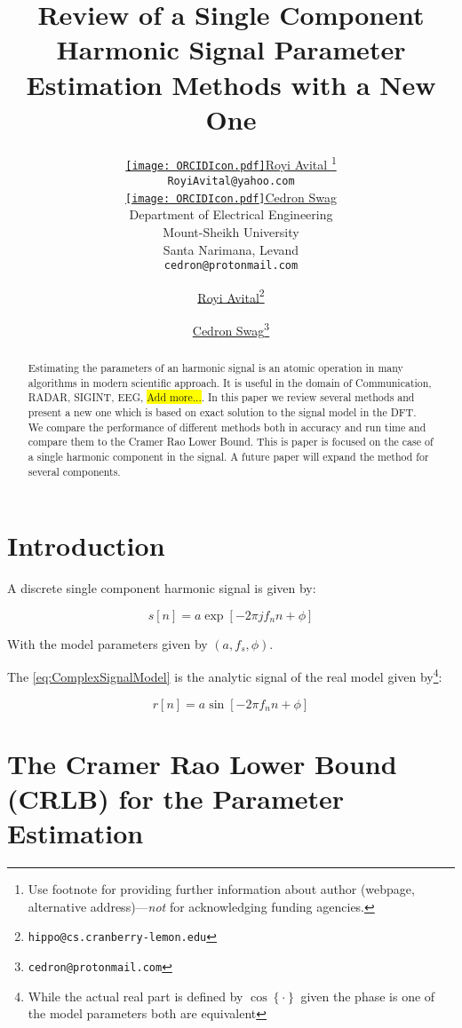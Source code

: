 \documentclass{article}
\title{Review of a Single Component Harmonic Signal Parameter Estimation Methods with a New One}
\author{ \href{https://orcid.org/0000-0001-9316-0369}{\texttt{[image: ORCIDIcon.pdf]}\hspace{1mm}Royi Avital }\thanks{Use footnote for providing further
		information about author (webpage, alternative
		address)---\emph{not} for acknowledging funding agencies.} \\
	\texttt{RoyiAvital@yahoo.com} \\
	\And
	\href{https://orcid.org/0000-0000-0000-0000}{\texttt{[image: ORCIDIcon.pdf]}\hspace{1mm}Cedron Swag} \\
	Department of Electrical Engineering\\
	Mount-Sheikh University\\
	Santa Narimana, Levand \\
	\texttt{cedron@protonmail.com} \\
}
\author[1]{%
	\href{https://orcid.org/0000-0001-9316-0369}{\usebox{\orcid}\hspace{1mm}Royi Avital\thanks{\texttt{hippo@cs.cranberry-lemon.edu}}}%
}
\author[1,2]{%
	\href{https://orcid.org/0000-0000-0000-0000}{\usebox{\orcid}\hspace{1mm}Cedron Swag\thanks{\texttt{cedron@protonmail.com}}}%
}
\affil[1]{}
\affil[2]{}
\newcommand{\MyParen}[1]{\left( #1 \right)}
\newcommand{\MyBrack}[1]{\left\lbrack #1 \right\rbrack}
\newcommand{\MyBrace}[1]{\left\lbrace #1 \right\rbrace}
\newcommand{\marker}[1]{\colorbox{yellow}{#1}}
\begin{document}
\maketitle

\begin{abstract}
	Estimating the parameters of an harmonic signal is an atomic operation in many algorithms in modern scientific approach. It is useful in the domain of Communication, RADAR, SIGINT, EEG, \marker{Add more...}. In this paper we review several methods and present a new one which is based on exact solution to the signal model in the DFT. We compare the performance of different methods both in accuracy and run time and compare them to the Cramer Rao Lower Bound. This is paper is focused on the case of a single harmonic component in the signal. A future paper will expand the method for several components.
\end{abstract}




\section{Introduction}
\label{sec:Intro}

A discrete single component harmonic signal is given by:

\begin{equation}
	 s \MyBrack{n} = a \exp \MyBrack{-2 \pi j {f}_{n} n + \phi} \tag{Complex Harmonic Signal} \label{eq:ComplexSignalModel}
\end{equation}

With the model parameters given by $ \MyParen{a, {f}_{s}, \phi} $.

The \ref{eq:ComplexSignalModel} is the analytic signal of the real model given by\footnote{While the actual real part is defined by $ \cos \MyBrace{\cdot} $ given the phase is one of the model parameters both are equivalent}:

\begin{equation}
	r \MyBrack{n} = a \sin \MyBrack{-2 \pi {f}_{n} n + \phi} \tag{Real Harmonic Signal} \label{eq:RealSignalModel}
\end{equation}


\section{The Cramer Rao Lower Bound (CRLB) for the Parameter Estimation}
\label{sec:CRLB}
\end{document}
